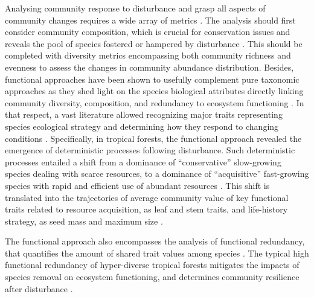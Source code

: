\documentclass[fleqn,10pt]{ArtEcoFoG} %
\begin{document}
Analysing community response to disturbance and grasp all aspects of
community changes requires a wide array of metrics
\citep{Sheil2003, Shea2004, Mayfield2010}. The analysis should first
consider community composition, which is crucial for conservation issues
and reveals the pool of species fostered or hampered by disturbance
\citep{Lavorel2002, Bellwood2006}. This should be completed with
diversity metrics encompassing both community richness and evenness to
assess the changes in community abundance distribution. Besides,
functional approaches have been shown to usefully complement pure
taxonomic approaches as they shed light on the species biological
attributes directly linking community diversity, composition, and
redundancy to ecosystem functioning \citep{Violle2007b, Baraloto2012a}.
In that respect, a vast literature allowed recognizing major traits
representing species ecological strategy and determining how they
respond to changing conditions \citep{Diaz2005}. Specifically, in
tropical forests, the functional approach revealed the emergence of
deterministic processes following disturbance. Such deterministic
processes entailed a shift from a dominance of ``conservative''
slow-growing species dealing with scarce resources, to a dominance of
``acquisitive'' fast-growing species with rapid and efficient use of
abundant resources \citep{Rees2001, Reich2014, Herault2011}. This shift
is translated into the trajectories of average community value of key
functional traits related to resource acquisition, as leaf and stem
traits, and life-history strategy, as seed mass and maximum size
\citep{Wright2004, TerSteege2006, Westoby2006a, Chave2009b}.

The functional approach also encompasses the analysis of functional
redundancy, that quantifies the amount of shared trait values among
species \citep{Carmona2016}. The typical high functional redundancy of
hyper-diverse tropical forests \citep{Bellwood2006} mitigates the
impacts of species removal on ecosystem functioning, and determines
community resilience after disturbance \citep{Elmqvist2003, Diaz2005}.
\end{document}
